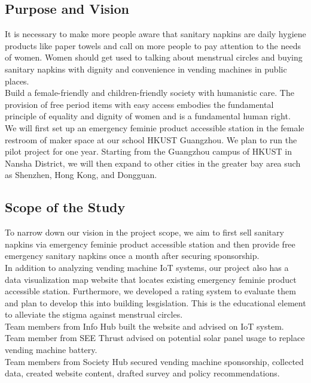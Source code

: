 \subsection{Purpose and Vision}
It is necessary to make more people aware that sanitary napkins are daily hygiene products like paper towels and call on more people to pay attention to the needs of women. Women should get used to talking about menstrual circles and buying sanitary napkins with dignity and convenience in vending machines in public places.\\

Build a female-friendly and children-friendly society with humanistic care. The provision of free period items with easy access embodies the fundamental principle of equality and dignity of women and is a fundamental human right. \\

We will first set up an emergency feminie product accessible station in the female restroom of maker space at our school HKUST Guangzhou. We plan to run the pilot project for one year. Starting from the Guangzhou campus of HKUST in Nansha District, we will then expand to other cities in the greater bay area such as Shenzhen, Hong Kong, and Dongguan.

\subsection{Scope of the Study}
To narrow down our vision in the project scope, we aim to first sell sanitary napkins via emergency feminie product accessible station and then provide free emergency sanitary napkins once a month after securing sponsorship. \\

In addition to analyzing vending machine IoT systems, our project also has a data visualization map website that locates existing emergency feminie product accessible station. Furthermore, we developed a rating system to evaluate them and plan to develop this into building lesgislation. This is the educational element to alleviate the stigma against menstrual circles.\\

Team members from Info Hub built the website and advised on IoT system. \\

Team member from SEE Thrust advised on potential solar panel usage to replace vending machine battery. \\

Team members from Society Hub secured vending machine sponsorship, collected data, created website content, drafted survey and policy recommendations.

